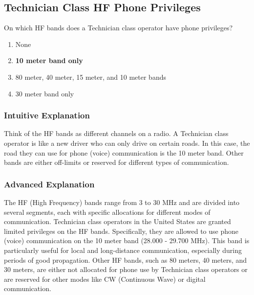 \subsection{Technician Class HF Phone Privileges}
\label{T1B06}

\begin{tcolorbox}[colback=gray!10!white,colframe=black!75!black,title=T1B06]
On which HF bands does a Technician class operator have phone privileges?
\begin{enumerate}[label=\Alph*),noitemsep]
    \item None
    \item \textbf{10 meter band only}
    \item 80 meter, 40 meter, 15 meter, and 10 meter bands
    \item 30 meter band only
\end{enumerate}
\end{tcolorbox}

\subsubsection*{Intuitive Explanation}
Think of the HF bands as different channels on a radio. A Technician class operator is like a new driver who can only drive on certain roads. In this case, the road they can use for phone (voice) communication is the 10 meter band. Other bands are either off-limits or reserved for different types of communication.

\subsubsection*{Advanced Explanation}
The HF (High Frequency) bands range from 3 to 30 MHz and are divided into several segments, each with specific allocations for different modes of communication. Technician class operators in the United States are granted limited privileges on the HF bands. Specifically, they are allowed to use phone (voice) communication on the 10 meter band (28.000 - 29.700 MHz). This band is particularly useful for local and long-distance communication, especially during periods of good propagation. Other HF bands, such as 80 meters, 40 meters, and 30 meters, are either not allocated for phone use by Technician class operators or are reserved for other modes like CW (Continuous Wave) or digital communication.